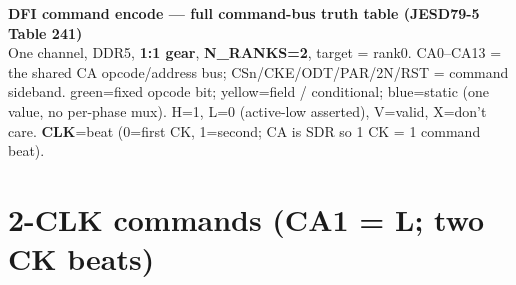 \documentclass[9pt]{extarticle}
\begin{document}
\begin{center}
{\LARGE\textbf{DFI command encode --- full command-bus truth table (JESD79-5 Table 241)}}\\[2pt]
{\small One channel, DDR5, \textbf{1:1 gear}, \textbf{N\_RANKS=2}, target = rank0.
CA0--CA13 = the shared CA opcode/address bus; CSn/CKE/ODT/PAR/2N/RST = command sideband.
\colorbox{opc}{green}=fixed opcode bit; \colorbox{fld}{yellow}=field / conditional; \colorbox{stat}{blue}=static (one value, no per-phase mux).
H=1, L=0 (active-low asserted), V=valid, X=don't care. \textbf{CLK}=beat (0=first CK, 1=second; CA is SDR so 1 CK = 1 command beat).}
\end{center}

\section{2-CLK commands  (CA1 = L; two CK beats)}
\end{document}
